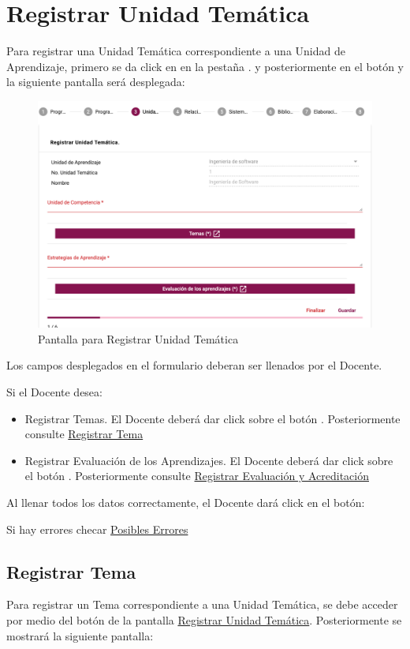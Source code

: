 \section{Registrar Unidad Temática}

Para registrar una Unidad Temática  correspondiente a una Unidad de Aprendizaje, primero se da click en en la pestaña . y posteriormente en el botón  y la siguiente pantalla será desplegada:

\hypertarget{RUT}{\begin{figure}[!h]
    \centering
    \hypertarget{9}{\includegraphics[width=0.5\linewidth]{images/SP6/RegistrarUT.png}}
    \caption{Pantalla para Registrar Unidad Temática}
\end{figure}
}


Los campos desplegados en el formulario deberan ser llenados por el Docente.

Si el Docente desea:

\begin{itemize}
    \item Registrar Temas. El Docente deberá dar click sobre el botón . Posteriormente consulte \hyperlink{RegistrarTema}{Registrar Tema}
    \item Registrar Evaluación de los Aprendizajes. El Docente deberá dar click sobre el botón . Posteriormente consulte \hyperlink{RegistrarEvalAprend}{Registrar Evaluación y Acreditación}
\end{itemize}

Al llenar todos los datos correctamente, el Docente dará click en el botón:

Si hay errores checar \hyperlink{Errores}{Posibles Errores}

\pagebreak

\hypertarget{RegistrarTema}{\subsection{Registrar Tema}}
Para registrar un Tema correspondiente a una Unidad Temática, se debe acceder por medio del botón  de la pantalla \hyperlink{RUT}{Registrar Unidad Temática}. Posteriormente se mostrará la siguiente pantalla:

